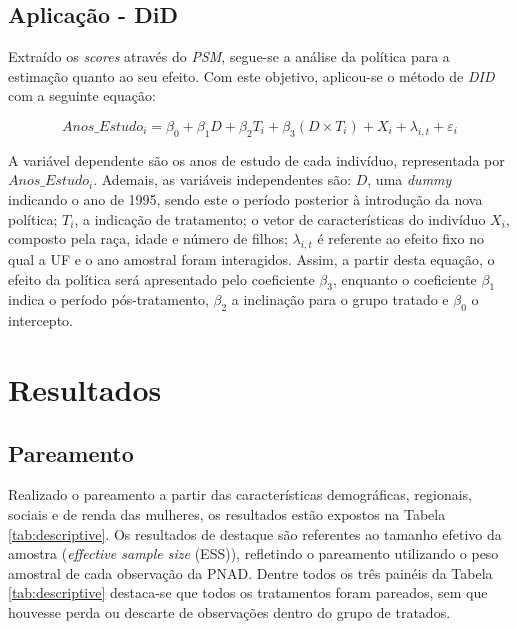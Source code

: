 \documentclass[12pt,oneside,a4paper]{article}
\begin{document}
\subsection{Aplicação - DiD}

Extraído os \textit{scores} através do \textit{PSM}, segue-se a análise da política para a estimação quanto ao seu efeito. Com este objetivo, aplicou-se o método de \textit{DID} com a seguinte equação:

$$ Anos\_Estudo_i = \beta_0 + \beta_1D + \beta_2T_i + \beta_3(D \times T_i) + X_i + \lambda_{i,t} + \varepsilon_i$$

A variável dependente são os anos de estudo de cada indivíduo, representada por \(Anos\_Estudo_i\). Ademais, as variáveis independentes são: \(D\), uma \textit{dummy} indicando o ano de 1995, sendo este o período posterior à introdução da nova política; \(T_i\), a indicação de tratamento; o vetor de características do indivíduo \(X_i\), composto pela raça, idade e número de filhos; \(\lambda_{i,t}\) é referente ao efeito fixo no qual a UF e o ano amostral foram interagidos. Assim, a partir desta equação, o efeito da política será apresentado pelo coeficiente \(\beta_3\), enquanto o coeficiente \(\beta_1\) indica o período pós-tratamento, \(\beta_2\) a inclinação para o grupo tratado e \(\beta_0\) o intercepto. 


\section{Resultados}
\subsection{Pareamento}

Realizado o pareamento a partir das características demográficas, regionais, sociais e de renda das mulheres, os resultados estão expostos na Tabela \ref{tab:descriptive}. Os resultados de destaque são referentes ao tamanho efetivo da amostra (\textit{effective sample size} (ESS)), refletindo o pareamento utilizando o peso amostral de cada observação da PNAD. Dentre todos os três painéis da Tabela \ref{tab:descriptive} destaca-se que todos os tratamentos foram pareados, sem que houvesse perda ou descarte de observações dentro do grupo de tratados.
\end{document}
